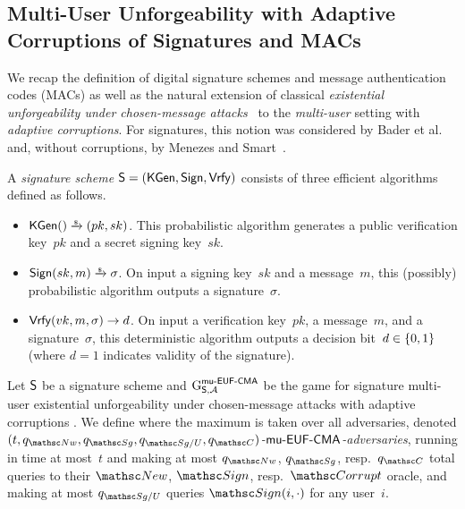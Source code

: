 \iffull
\subsection{Multi-User Unforgeability with Adaptive Corruptions of Signatures and MACs}
\label{sec:components:muSigMac}

We recap the definition of digital signature schemes and message authentication codes (MACs) as well as the natural extension of classical \emph{existential unforgeability under chosen-message attacks}~\cite{GolMicRiv88} to the \emph{multi-user} setting with \emph{adaptive corruptions}.
For signatures, this notion was considered by Bader et al.~\cite{TCC:BHJKL15} and, without corruptions, by Menezes and Smart~\cite{DCC:MenSma04}.

\else
\label{apx:components:muSigMAC}
\fi


\iffull
\begin{definition}
	\label{def:signature-scheme}
	A \emph{signature scheme} $\mathsf{S} = (\mathsf{KGen},\allowbreak \mathsf{Sign},\allowbreak \mathsf{Vrfy})$ consists of three efficient algorithms defined as follows.
	\begin{itemize}
		\item $\SIGKGen() \tor (pk, sk)$.
			This probabilistic algorithm generates a public verification key~$pk$ and a secret signing key~$sk$.
		
		\item $\SIGSign(sk, m) \tor \sigma$.
			On input a signing key~$sk$ and a message~$m$, this (possibly) probabilistic algorithm outputs a signature~$\sigma$.
		
		\item $\mathsf{Vrfy}(vk, m, \sigma) \to d$.
			On input a verification key~$pk$, a message~$m$, and a signature~$\sigma$, this deterministic algorithm outputs a decision bit~$d \in \{0,1\}$ (where $d = 1$ indicates validity of the signature).
	\end{itemize}
\end{definition}
\fi


\begin{definition}
	\label{def:signature-muEUFCMA}
	Let $\mathsf{S}$ be a signature scheme
	and $\textnormal{G}^{\mathsf{mu{\text{\normalfont-}}EUF{\text{\normalfont-}}CMA}}_{\mathsf{S},\mathcal{A}}$ be the game for signature multi-user existential unforgeability under chosen-message attacks with adaptive corruptions .
	We define
	where the maximum is taken over all adversaries, denoted \emph{$(t, \qNew, \qSign, \qSignU, \qCorrupt)$-}\emph{$\mathsf{mu{\text{\normalfont-}}EUF{\text{\normalfont-}}CMA}$-adversaries}, running in time at most~$t$ and making at most $\qNew$, $\qSign$, resp.\ $\qCorrupt$ total queries to their $\New$, $\OSign$, resp.\ $\Corrupt$ oracle, and making at most $\qSignU$ queries $\OSign(i, \cdot)$ for any user~$i$.
\end{definition}


